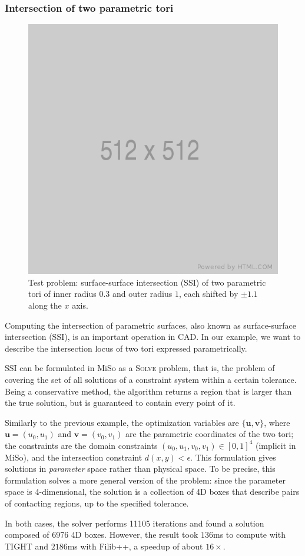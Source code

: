 \subsubsection{Intersection of two parametric tori}
\begin{figure}
	\includegraphics[width=0.4\linewidth]{fig/512x512.png}
	\centering
	\caption{Test problem: surface-surface intersection (SSI) of two parametric tori of inner radius $0.3$ and outer radius $1$, each shifted by $\pm1.1$ along the $x$ axis.}
	\label{fig:tori}
\end{figure}
Computing the intersection of parametric surfaces, also known as surface-surface intersection (SSI), is an important operation in CAD.
In our example, we want to describe the intersection locus of two tori expressed parametrically.

SSI can be formulated in MiSo as a \textsc{Solve} problem, that is, the problem of covering the set of all solutions of a constraint system within a certain tolerance.
Being a conservative method, the algorithm returns a region that is larger than the true solution, but is guaranteed to contain every point of it.

Similarly to the previous example, the optimization variables are $\{\mathbf{u}, \mathbf{v}\}$, where $\mathbf{u}=(u_0, u_1)$ and $\mathbf{v}=(v_0, v_1)$ are the parametric coordinates of the two tori;
the constraints are the domain constraints $(u_0,u_1,v_0,v_1)\in[0,1]^4$ (implicit in MiSo), and the intersection constraint $d(x,y)<\epsilon$.
This formulation gives solutions in \emph{parameter} space rather than physical space. To be precise, this formulation solves a more general version of the problem: since the parameter space is 4-dimensional, the solution is a collection of 4D boxes that describe pairs of contacting regions, up to the specified tolerance.

In both cases, the solver performs 11105 iterations and found a solution composed of 6976 4D boxes. However, the result took $136$ms to compute with TIGHT and $2186$ms with Filib++, a speedup of about $16\times$.

